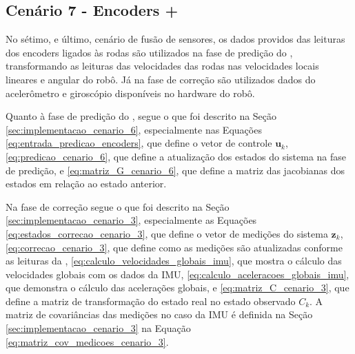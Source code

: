 \documentclass[acronym, symbols, table, deposito]{fei}
\begin{document}
		\subsection{Cenário 7 - Encoders + } \label{sec:implementacao_cenario_7}
		
			No sétimo, e último, cenário de fusão de sensores, os dados providos das leituras dos encoders ligados às rodas são utilizados na fase de predição do , transformando as leituras das velocidades das rodas nas velocidades locais lineares e angular do robô. Já na fase de correção são utilizados dados do acelerômetro e giroscópio disponíveis no hardware do robô.
			
			Quanto à fase de predição do , segue o que foi descrito na Seção \ref{sec:implementacao_cenario_6}, especialmente nas Equações \eqref{eq:entrada_predicao_encoders}, que define o vetor de controle $\textbf{u}_k$, \eqref{eq:predicao_cenario_6}, que define a atualização dos estados do sistema na fase de predição, e \eqref{eq:matriz_G_cenario_6}, que define a matriz das jacobianas dos estados em relação ao estado anterior.
			
			Na fase de correção segue o que foi descrito na Seção \ref{sec:implementacao_cenario_3}, especialmente as Equações \eqref{eq:estados_correcao_cenario_3}, que define o vetor de medições do sistema $\textbf{z}_k$, \eqref{eq:correcao_cenario_3}, que define como as medições são atualizadas conforme as leituras da , \eqref{eq:calculo_velocidades_globais_imu}, que mostra o cálculo das velocidades globais com os dados da IMU, \eqref{eq:calculo_aceleracoes_globais_imu}, que demonstra o cálculo das acelerações globais, e \eqref{eq:matriz_C_cenario_3}, que define a matriz de transformação do estado real no estado observado $C_{k}$. A matriz de covariâncias das medições no caso da IMU é definida na Seção \ref{sec:implementacao_cenario_3} na Equação \eqref{eq:matriz_cov_medicoes_cenario_3}.
		
\end{document}
